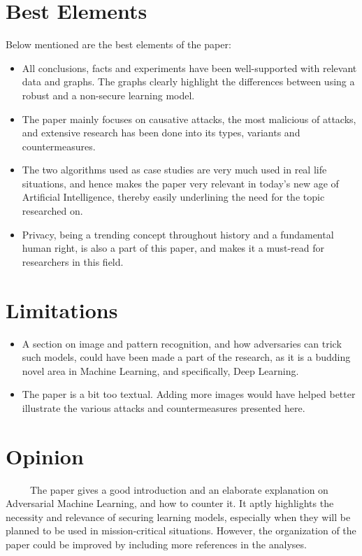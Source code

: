 \documentclass[twoside,twocolumn]{article}
\begin{document}
\section{Best Elements}
Below mentioned are the best elements of the paper:
\begin{itemize}
\item All conclusions, facts and experiments have been well-supported with relevant data and graphs. The graphs clearly highlight the differences between using a robust and a non-secure learning model.

\item The paper mainly focuses on causative attacks, the most malicious of attacks, and extensive research has been done into its types, variants and countermeasures.

\item The two algorithms used as case studies are very much used in real life situations, and hence makes the paper very relevant in today's new age of Artificial Intelligence, thereby easily underlining the need for the topic researched on.

\item Privacy, being a trending concept throughout history and a fundamental human right, is also a part of this paper, and makes it a must-read for researchers in this field.
\end{itemize}
%
\section{Limitations}
\begin{itemize}
\item A section on image and pattern recognition, and how adversaries can trick such models, could have been made a part of the research, as it is a budding novel area in Machine Learning, and specifically, Deep Learning.
\item The paper is a bit too textual. Adding more images would have helped better illustrate the various attacks and countermeasures presented here.
\end{itemize}
%
%
\section{Opinion}
~~~~~The paper gives a good introduction and an elaborate explanation on Adversarial Machine Learning, and how to counter it. It aptly highlights the necessity and relevance of securing learning models, especially when they will be planned to be used in mission-critical situations. However, the organization of the paper could be improved by including more references in the analyses.
%
\end{document}
